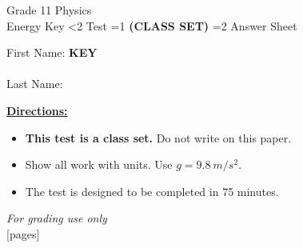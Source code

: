 \documentclass[addpoints]{exam}
\newcommand{\event}{Energy}
\newcommand{\tournament}{}
\def\type{0}
\begin{document}
\begin{center}
    {\huge Grade 11 Physics \\ \event
    \ifprintanswers \space Key
    \else \space \ifnum\type<2 Test \fi \ifnum\type=1 \textbf{(CLASS SET)} \fi
          \ifnum\type=2 Answer Sheet \fi
    \fi \\ \vspace{3mm}\tournament\vspace{1mm}}
\end{center}

\vspace{.25\textheight}

\begin{center}
    First Name: \ifprintanswers
    \underline{\hspace{3.5cm}}\textbf{KEY}\underline{\hspace{5.5cm}}\\\vspace{5mm}
    \else \underline{\hspace{10cm}}\\ \vspace{5mm} \fi
    Last Name: \underline{\hspace{10cm}}\\ \vspace{5mm}
\end{center}

\noindent\textbf{\underline{Directions:}}
\begin{itemize}
    \ifnum\type=1 \item \textbf{This test is a class set.} Do not write on this paper. \fi
    \item Show all work with units. Use $g = \SI{9.8}{m/s^2}$.
    \item The test is designed to be completed in 75 minutes.
\end{itemize}
\begin{center}
\textit{For grading use only}\\
[pages]
\end{center}
\end{document}

